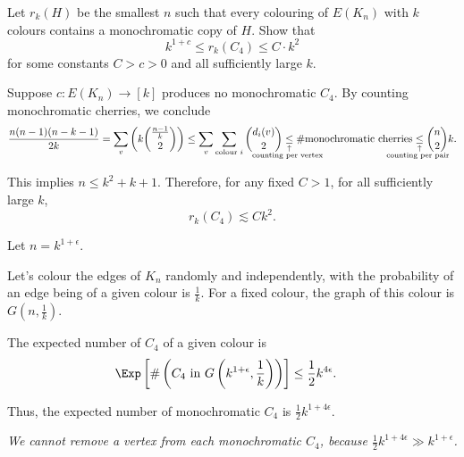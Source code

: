 \documentclass[10pt, a4paper]{article}
\newcommand{\signexpl}[3]{%
  \underset{\substack{\uparrow\\\mathrlap{\text{\hspace{#3}#2}}}}{#1}}
\begin{document}
\newpage
\begin{prob}
	Let $r_k(H)$ be the smallest $n$ such that every colouring of $E(K_n)$ with $k$ colours contains a monochromatic copy of $H$. Show that \[
		k^{1+c} \le r_k(C_4) \le C\cdot k^2
	\]
	for some constants $C > c > 0$ and all sufficiently large $k$.
\end{prob}
\begin{sol}
	Suppose $c \colon E(K_n) \to [k]$ produces no monochromatic $C_4$. By counting monochromatic cherries, we conclude \[
		\frac{n(n-1)(n-k-1)}{2k} = \sum_v\left( k \binom{\frac{n-1}{k}}{2} \right) \le \sum_v \sum_{\text{colour }i} \binom{d_i(v)}{2} \signexpl{\le}{counting per vertex}{-4.5em} \#\text{monochromatic cherries} \signexpl{\le}{counting per pair}{-4em} \binom{n}{2} k.
	\]
	
	This implies $n \le k^2 + k + 1$. Therefore, for any fixed $C > 1$, for all sufficiently large $k$, \[
		r_k(C_4) \lesssim Ck^2.
	\]
\end{sol}
\begin{idea}
	Let $n = k^{1+\epsilon}$.

	Let's colour the edges of $K_n$ randomly and independently, with the probability of an edge being of a given colour is $\frac{1}{k}$. For a fixed colour, the graph of this colour is $G(n, \frac{1}{k})$.

	The expected number of $C_4$ of a given colour is
	\begin{align*}
		\Exp\left[\#\left(C_4 \text{ in } G\left(k^{1+\epsilon}, \frac{1}{k}\right)\right)\right]
		&\le \frac{1}{2} k^{4\epsilon}.
	\end{align*}

	Thus, the expected number of monochromatic $C_4$ is $\frac{1}{2}k^{1+4\epsilon}$.

	\emph{We cannot remove a vertex from each monochromatic $C_4$, because $\frac{1}{2}k^{1+4\epsilon} \gg k^{1+\epsilon}$.}
\end{idea}
\end{document}
